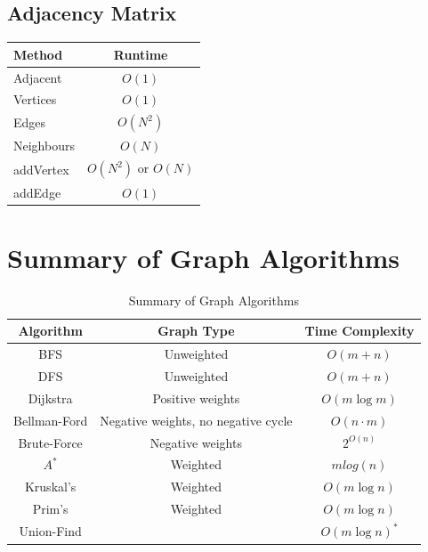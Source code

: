 \documentclass{article}
\begin{document}
\newpage

\subsection{Adjacency Matrix}
\begin{table}[!ht]
\centering
\begin{tabular}{|l|c|}
\hline
\textbf{Method} & \textbf{Runtime} \\
\hline
Adjacent & $O(1)$ \\
\hline
Vertices & $O(1)$ \\
\hline
Edges & $O(N^2)$ \\
\hline
Neighbours & $O(N)$ \\
\hline 
addVertex & $O(N^2)$ or $O(N)$ \\
\hline
addEdge & $O(1)$ \\
\hline
\end{tabular}
\end{table}


\section{Summary of Graph Algorithms}
\begin{table}[!ht]
\centering
\begin{tabular}{|c|c|c|}
\hline
\textbf{Algorithm} & \textbf{Graph Type} & \textbf{Time Complexity} \\
\hline
BFS & Unweighted & \( O(m + n) \) \\
\hline
DFS & Unweighted & \( O(m + n) \)\\
\hline
Dijkstra & Positive weights & \( O(m \log m) \) \\
\hline
Bellman-Ford & Negative weights, no negative cycle & \( O(n \cdot m) \) \\
\hline
Brute-Force & Negative weights & \( 2^{O(n)} \) \\
\hline
$A^*$ &Weighted& $mlog( n )$ \\
\hline
Kruskal's &Weighted& \( O(m \log n) \) \\
\hline
Prim's  &Weighted& \( O(m \log n) \) \\
\hline
Union-Find  && \( O(m \log n)^* \) \\
\hline
\end{tabular}
\caption{Summary of Graph Algorithms}
\end{table}
\end{document}
